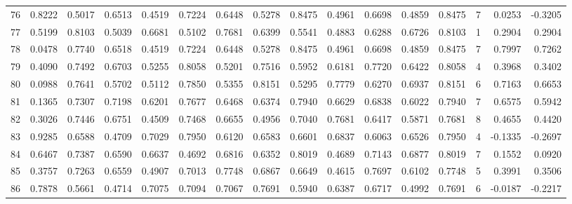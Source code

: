 \begin{tabular}{lrrrrrrrrrrrrrrr}
76  &      0.8222 &  0.5017 &  0.6513 &  0.4519 &  0.7224 &  0.6448 &  0.5278 &  0.8475 &  0.4961 &  0.6698 &   0.4859 &     0.8475 &      7 &                    0.0253 &                    -0.3205 \\
77  &      0.5199 &  0.8103 &  0.5039 &  0.6681 &  0.5102 &  0.7681 &  0.6399 &  0.5541 &  0.4883 &  0.6288 &   0.6726 &     0.8103 &      1 &                    0.2904 &                     0.2904 \\
78  &      0.0478 &  0.7740 &  0.6518 &  0.4519 &  0.7224 &  0.6448 &  0.5278 &  0.8475 &  0.4961 &  0.6698 &   0.4859 &     0.8475 &      7 &                    0.7997 &                     0.7262 \\
79  &      0.4090 &  0.7492 &  0.6703 &  0.5255 &  0.8058 &  0.5201 &  0.7516 &  0.5952 &  0.6181 &  0.7720 &   0.6422 &     0.8058 &      4 &                    0.3968 &                     0.3402 \\
80  &      0.0988 &  0.7641 &  0.5702 &  0.5112 &  0.7850 &  0.5355 &  0.8151 &  0.5295 &  0.7779 &  0.6270 &   0.6937 &     0.8151 &      6 &                    0.7163 &                     0.6653 \\
81  &      0.1365 &  0.7307 &  0.7198 &  0.6201 &  0.7677 &  0.6468 &  0.6374 &  0.7940 &  0.6629 &  0.6838 &   0.6022 &     0.7940 &      7 &                    0.6575 &                     0.5942 \\
82  &      0.3026 &  0.7446 &  0.6751 &  0.4509 &  0.7468 &  0.6655 &  0.4956 &  0.7040 &  0.7681 &  0.6417 &   0.5871 &     0.7681 &      8 &                    0.4655 &                     0.4420 \\
83  &      0.9285 &  0.6588 &  0.4709 &  0.7029 &  0.7950 &  0.6120 &  0.6583 &  0.6601 &  0.6837 &  0.6063 &   0.6526 &     0.7950 &      4 &                   -0.1335 &                    -0.2697 \\
84  &      0.6467 &  0.7387 &  0.6590 &  0.6637 &  0.4692 &  0.6816 &  0.6352 &  0.8019 &  0.4689 &  0.7143 &   0.6877 &     0.8019 &      7 &                    0.1552 &                     0.0920 \\
85  &      0.3757 &  0.7263 &  0.6559 &  0.4907 &  0.7013 &  0.7748 &  0.6867 &  0.6649 &  0.4615 &  0.7697 &   0.6102 &     0.7748 &      5 &                    0.3991 &                     0.3506 \\
86  &      0.7878 &  0.5661 &  0.4714 &  0.7075 &  0.7094 &  0.7067 &  0.7691 &  0.5940 &  0.6387 &  0.6717 &   0.4992 &     0.7691 &      6 &                   -0.0187 &                    -0.2217 \\

\end{tabular}
